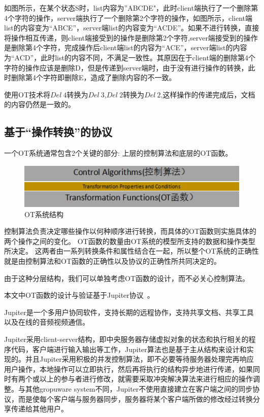 如图所示，在某个状态S时，list内容为”ABCDE"，此时client端执行了一个删除第4个字符的操作，server端执行了一个删除第2个字符的操作，如图所示，client端list的内容变为“ABCE”，server端list的内容变为“ACDE”。如果不进行转换，直接将操作相互传递，则client端接受到的操作是删除第2个字符,server端接受到的操作是删除第4个字符，完成操作后client端list的内容为“ACE”，server端list的内容为“ACD”，此时list的内容不同，不满足一致性。其原因在于client端的删除第4个字符的操作应该是删除D，但是传递到server端时，由于没有进行操作的转换，此时删除第4个字符即删除E，造成了删除内容的不一致。

使用OT技术将$Del\ 4$转换为$Del\ 3$,$Del\ 2$转换为$Del\ 2$,这样操作的传递完成后，文档的内容仍然是一致的。

\subsection{基于``操作转换''的协议}
一个OT系统通常包含2个关键的部分: 上层的控制算法和底层的OT函数。

\begin{figure}[H]
\centering
\includegraphics{figures/structure.bmp}
\caption{OT系统结构}
\end{figure}

控制算法负责决定哪些操作以何种顺序进行转换，而具体的OT函数则实施具体的两个操作之间的变化。
OT函数的数量由OT系统的模型所支持的数据和操作类型所决定。
这两者由一系列转换条件和属性结合在一起，所以整个OT系统的正确性就是由控制算法和OT函数的正确性以及协议的正确性所共同决定的。

由于这种分层结构，我们可以单独考虑OT函数的设计，而不必关心控制算法。

本文中OT函数的设计与验证基于Jupiter协议~\cite{Nichols:UIST95}。

Jupiter是一个多用户协同软件，支持长期的远程协作，支持共享文档、共享工具以及在线的音频视频通信。

Jupiter采用client-server结构，即中央服务器存储虚拟对象的状态和执行相关的程序代码，客户端进行输入输出等工作，Jupiter算法也是基于主从结构来设计和实现的。并且Jupiter采用积极的并发控制算法，即不必要等待服务器处理完再响应用户操作，本地操作可以立即执行，然后再将执行的结构异步地进行传递，如果同时有两个或以上的参与者进行修改，就需要采取冲突解决算法来进行相应的操作调整。与其他gropuware system不同，Jupiter不使用直接建立在客户端之间的同步协议，而是使每个客户端与服务器同步，服务器将某个客户端所做的修改经过转换分享传递给其他用户。

